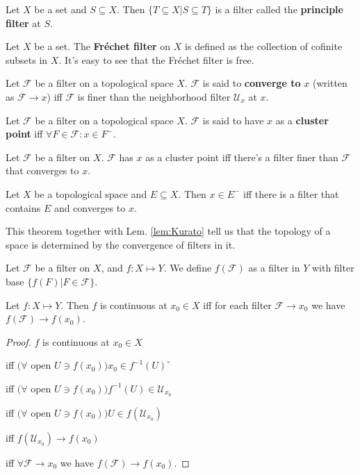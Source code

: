\documentclass[12pt]{book}
\begin{document}
\begin{example}
	Let $X$ be a set and $S\subseteq X$. Then $\{T\subseteq X|S\subseteq T\}$ is a filter called the {\bf principle filter} at $S$.
\end{example}

\begin{example}
	Let $X$ be a set. The {\bf Fr\'echet filter} on $X$ is defined as the collection of cofinite subsets in $X$. It's easy to see that the Fr\'echet filter is free.
\end{example}

\begin{definition}
	Let $\mathcal F$ be a filter on a topological space $X$. $\mathcal F$ is said to {\bf converge to} $x$ (written as $\mathcal F\rightarrow x$) iff $\mathcal F$ is finer than the neighborhood filter $\mathcal U_x$ at $x$.
\end{definition}

\begin{definition}
	Let $\mathcal F$ be a filter on a topological space $X$. $\mathcal F$ is said to have $x$ as a {\bf cluster point} iff $\forall F\in \mathcal F: x\in F^-$.
\end{definition}

\begin{theorem}
	Let $\mathcal F$ be a filter on $X$. $\mathcal F$ has $x$ as a cluster point iff there's a filter finer than $\mathcal F$ that converges to $x$.
\end{theorem}

\begin{theorem}
	Let $X$ be a topological space and $E\subseteq X$. Then $x\in E^-$ iff there is a filter that contains $E$ and converges to $x$.
\end{theorem}

This theorem together with Lem. \ref{lem:Kurato} tell us that the topology of a space is determined by the convergence of filters in it.

\begin{definition}
	Let $\mathcal F$ be a filter on $X$, and $f:X\mapsto Y$. We define $f(\mathcal F)$ as a filter in $Y$ with filter base $\{f(F)|F\in\mathcal F\}$.
\end{definition}

\begin{theorem}
	Let $f:X\mapsto Y$. Then $f$ is continuous at $x_0\in X$ iff for each filter $\mathcal F\rightarrow x_0$ we have $f(\mathcal F)\rightarrow f(x_0)$.
\end{theorem}
\begin{proof}
	$f$ is continuous at $x_0\in X$ 
	
	iff $(\forall $ open $U\ni f(x_0))x_0\in f^{-1}(U)^\circ$ 
	
	iff $(\forall $ open $U\ni f(x_0)) f^{-1}(U)\in\mathcal U_{x_0}$ 
	
	iff $(\forall $ open $U\ni f(x_0))U\in f(\mathcal U_{x_0})$ 
	
	iff $ f(\mathcal U_{x_0})\rightarrow f(x_0)$ 
	
	iff $\forall\mathcal F\rightarrow x_0$ we have $f(\mathcal F)\rightarrow f(x_0)$.
\end{proof}
\end{document}
